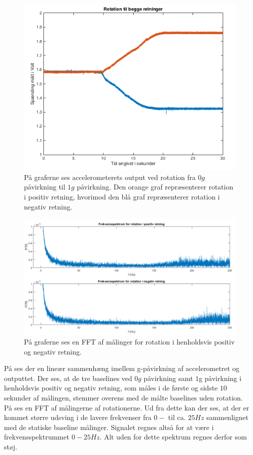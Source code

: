 \begin{figure}[H]
	\centering
	\includegraphics[scale=0.45]{figures/cProblemloesning/Pilotforsoeg_Rotation.png}
	\caption{På graferne ses accelerometerets output ved rotation fra $0g$ påvirkning til $1g$ påvirkning. Den orange graf repræsenterer rotation i positiv retning, hvorimod den blå graf repræsenterer rotation i negativ retning.}
	\label{Fig:Pilot_Rottid}
\end{figure}
\begin{figure}[H]
	\centering
	\includegraphics[scale=0.5]{figures/cProblemloesning/Pilotforsoeg_RotationFrekvens.png}
	\caption{På graferne ses en FFT af målinger for rotation i henholdsvis positiv og negativ retning.}
	\label{Fig:Pilot_Rotfrek}
\end{figure}
På  ses der en lineær sammenhæng imellem g-påvirkning af accelerometret og outputtet. Der ses, at de tre baselines ved $0g$ påvirkning samt $1$g påvirkning i henholdsvis positiv og negativ retning, som måles i de første og sidste $10$ sekunder af målingen, stemmer overens med de målte baselines uden rotation. \\
På  ses en FFT af målingerne af rotationerne. Ud fra dette kan der ses, at der er kommet større udsving i de lavere frekvenser fra $0-$ til ca. $25Hz$ sammenlignet med de statiske baseline målinger. Signalet regnes altså for at være i frekvensspektrummet $0-25Hz$. Alt uden for dette spektrum regnes derfor som støj.

